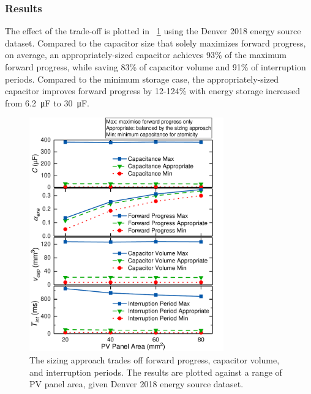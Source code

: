 \subsubsection{Results}

The effect of the trade-off is plotted in \figurename{~\ref{fig:tradeoff}} using the Denver 2018 energy source dataset. Compared to the capacitor size that solely maximizes forward progress, on average, an appropriately-sized capacitor achieves 93\% of the maximum forward progress, while saving 83\% of capacitor volume and 91\% of interruption periods. Compared to the minimum storage case, the appropriately-sized capacitor improves forward progress by 12-124\% with energy storage increased from \SI{6.2}{\micro\farad} to \SI{30}{\micro\farad}.

\begin{figure}[!t]
    \centering
    \includegraphics[width=3.3in]{ch4_sizingapproach/figures/Tradeoff3Fig}
    \caption{The sizing approach trades off forward progress, capacitor volume, and interruption periods. The results are plotted against a range of PV panel area, given Denver 2018 energy source dataset. }
    \label{fig:tradeoff}
\end{figure}

